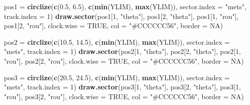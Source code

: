 \documentclass[
]{article}
\newenvironment{Shaded}{\begin{snugshade}}{\end{snugshade}}
\newcommand{\DataTypeTok}[1]{\textcolor[rgb]{0.13,0.29,0.53}{#1}}
\newcommand{\DecValTok}[1]{\textcolor[rgb]{0.00,0.00,0.81}{#1}}
\newcommand{\FloatTok}[1]{\textcolor[rgb]{0.00,0.00,0.81}{#1}}
\newcommand{\KeywordTok}[1]{\textcolor[rgb]{0.13,0.29,0.53}{\textbf{#1}}}
\newcommand{\NormalTok}[1]{#1}
\newcommand{\OtherTok}[1]{\textcolor[rgb]{0.56,0.35,0.01}{#1}}
\newcommand{\StringTok}[1]{\textcolor[rgb]{0.31,0.60,0.02}{#1}}
\begin{document}
\begin{Shaded}
\begin{Highlighting}[]
\NormalTok{pos1 =}\StringTok{ }\KeywordTok{circlize}\NormalTok{(}\KeywordTok{c}\NormalTok{(}\FloatTok{0.5}\NormalTok{, }\FloatTok{6.5}\NormalTok{), }\KeywordTok{c}\NormalTok{(}\KeywordTok{min}\NormalTok{(YLIM), }\KeywordTok{max}\NormalTok{(YLIM)), }\DataTypeTok{sector.index =} \StringTok{"mets"}\NormalTok{, }\DataTypeTok{track.index =} \DecValTok{1}\NormalTok{)}
\KeywordTok{draw.sector}\NormalTok{(pos1[}\DecValTok{1}\NormalTok{, }\StringTok{"theta"}\NormalTok{], pos1[}\DecValTok{2}\NormalTok{, }\StringTok{"theta"}\NormalTok{], pos1[}\DecValTok{1}\NormalTok{, }\StringTok{"rou"}\NormalTok{], pos1[}\DecValTok{2}\NormalTok{, }\StringTok{"rou"}\NormalTok{], }\DataTypeTok{clock.wise =} \OtherTok{TRUE}\NormalTok{, }\DataTypeTok{col =} \StringTok{"#CCCCCC56"}\NormalTok{, }\DataTypeTok{border =} \OtherTok{NA}\NormalTok{) }

\NormalTok{pos2 =}\StringTok{ }\KeywordTok{circlize}\NormalTok{(}\KeywordTok{c}\NormalTok{(}\FloatTok{10.5}\NormalTok{, }\FloatTok{14.5}\NormalTok{), }\KeywordTok{c}\NormalTok{(}\KeywordTok{min}\NormalTok{(YLIM), }\KeywordTok{max}\NormalTok{(YLIM)), }\DataTypeTok{sector.index =} \StringTok{"mets"}\NormalTok{, }\DataTypeTok{track.index =} \DecValTok{1}\NormalTok{)}
\KeywordTok{draw.sector}\NormalTok{(pos2[}\DecValTok{1}\NormalTok{, }\StringTok{"theta"}\NormalTok{], pos2[}\DecValTok{2}\NormalTok{, }\StringTok{"theta"}\NormalTok{], pos2[}\DecValTok{1}\NormalTok{, }\StringTok{"rou"}\NormalTok{], pos2[}\DecValTok{2}\NormalTok{, }\StringTok{"rou"}\NormalTok{], }\DataTypeTok{clock.wise =} \OtherTok{TRUE}\NormalTok{, }\DataTypeTok{col =} \StringTok{"#CCCCCC56"}\NormalTok{, }\DataTypeTok{border =} \OtherTok{NA}\NormalTok{) }

\NormalTok{pos3 =}\StringTok{ }\KeywordTok{circlize}\NormalTok{(}\KeywordTok{c}\NormalTok{(}\FloatTok{20.5}\NormalTok{, }\FloatTok{24.5}\NormalTok{), }\KeywordTok{c}\NormalTok{(}\KeywordTok{min}\NormalTok{(YLIM), }\KeywordTok{max}\NormalTok{(YLIM)), }\DataTypeTok{sector.index =} \StringTok{"mets"}\NormalTok{, }\DataTypeTok{track.index =} \DecValTok{1}\NormalTok{)}
\KeywordTok{draw.sector}\NormalTok{(pos3[}\DecValTok{1}\NormalTok{, }\StringTok{"theta"}\NormalTok{], pos3[}\DecValTok{2}\NormalTok{, }\StringTok{"theta"}\NormalTok{], pos3[}\DecValTok{1}\NormalTok{, }\StringTok{"rou"}\NormalTok{], pos3[}\DecValTok{2}\NormalTok{, }\StringTok{"rou"}\NormalTok{], }\DataTypeTok{clock.wise =} \OtherTok{TRUE}\NormalTok{, }\DataTypeTok{col =} \StringTok{"#CCCCCC56"}\NormalTok{, }\DataTypeTok{border =} \OtherTok{NA}\NormalTok{) }


\end{Highlighting}
\end{Shaded}
\end{document}
